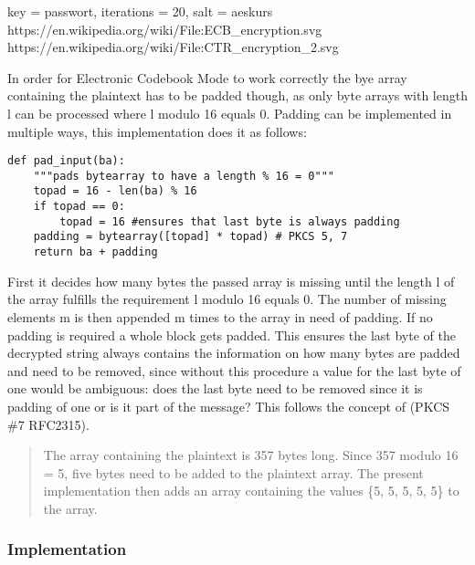 key = passwort, iterations = 20, salt = aeskurs
https://en.wikipedia.org/wiki/File:ECB\_encryption.svg
https://en.wikipedia.org/wiki/File:CTR\_encryption\_2.svg

In order for Electronic Codebook Mode to work correctly the bye array
containing the plaintext has to be padded though, as only byte arrays
with length l can be processed where l modulo 16 equals 0. Padding can
be implemented in multiple ways, this implementation does it as follows:

\begin{lstlisting}
def pad_input(ba):
    """pads bytearray to have a length % 16 = 0"""
    topad = 16 - len(ba) % 16
    if topad == 0:
        topad = 16 #ensures that last byte is always padding
    padding = bytearray([topad] * topad) # PKCS 5, 7
    return ba + padding
\end{lstlisting}

First it decides how many bytes the passed array is missing until the
length l of the array fulfills the requirement l modulo 16 equals 0. The
number of missing elements m is then appended m times to the array in
need of padding. If no padding is required a whole block gets padded.
This ensures the last byte of the decrypted string always contains the
information on how many bytes are padded and need to be removed, since
without this procedure a value for the last byte of one would be
ambiguous: does the last byte need to be removed since it is padding of
one or is it part of the message? This follows the concept of (PKCS \#7
RFC2315).

\begin{quote}
The array containing the plaintext is 357 bytes long. Since 357 modulo 16 = 5,
five bytes need to be added to the plaintext array. The present
implementation then adds an array containing the values \{5, 5, 5, 5,
5\} to the array.
\end{quote}

\hypertarget{implementation-6}{%
\subsubsection{Implementation}\label{implementation-6}}

